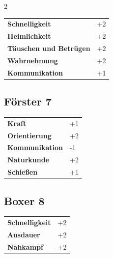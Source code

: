 \begin{multicols}{2}
\begin{tcolorbox}
\vspace{3mm}

\begin{tabular}{@{}ll@{}}
    \textbf{Schnelligkeit} & +2\\
    \textbf{Heimlichkeit} & +2\\
    \textbf{Täuschen und Betrügen} & +2\\
    \textbf{Wahrnehmung} & +2\\
    \textbf{Kommunikation} & +1\\
\end{tabular}


\end{tcolorbox}

\begin{tcolorbox}
    \subsection*{Förster \hfill \small{7 }}
    \tcblower




\begin{tabular}{@{}ll@{}}
    \textbf{Kraft} & +1\\
    \textbf{Orientierung} & +2\\
    \textbf{Kommunikation} & -1\\
    \textbf{Naturkunde} & +2\\
    \textbf{Schießen} & +1\\
\end{tabular}


\end{tcolorbox}

\begin{tcolorbox}
    \subsection*{Boxer \hfill \small{8 }}
    \tcblower




\begin{tabular}{@{}ll@{}}
    \textbf{Schnelligkeit} & +2\\
    \textbf{Ausdauer} & +2\\
    \textbf{Nahkampf} & +2\\
\end{tabular}


\end{tcolorbox}
\end{multicols}
